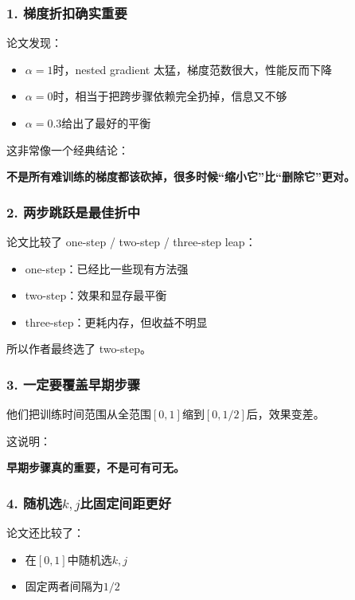 \subsubsection{1. 梯度折扣确实重要}

论文发现：

\begin{itemize}[leftmargin=1.5em]
  \item $\alpha = 1$时，nested gradient 太猛，梯度范数很大，性能反而下降
  \item $\alpha = 0$时，相当于把跨步骤依赖完全扔掉，信息又不够
  \item \textbf{$\alpha = 0.3$}给出了最好的平衡
\end{itemize}

这非常像一个经典结论：

\textbf{不是所有难训练的梯度都该砍掉，很多时候“缩小它”比“删除它”更对。}

\subsubsection{2. 两步跳跃是最佳折中}

论文比较了 one-step / two-step / three-step leap：

\begin{itemize}[leftmargin=1.5em]
  \item one-step：已经比一些现有方法强
  \item two-step：效果和显存最平衡
  \item three-step：更耗内存，但收益不明显
\end{itemize}

所以作者最终选了 two-step。

\subsubsection{3. 一定要覆盖早期步骤}

他们把训练时间范围从全范围$[0,1]$缩到$[0,1/2]$后，效果变差。

这说明：

\textbf{早期步骤真的重要，不是可有可无。}

\subsubsection{4. 随机选$k,j$比固定间距更好}

论文还比较了：

\begin{itemize}[leftmargin=1.5em]
  \item 在$[0,1]$中随机选$k,j$
  \item 固定两者间隔为$1/2$
\end{itemize}


